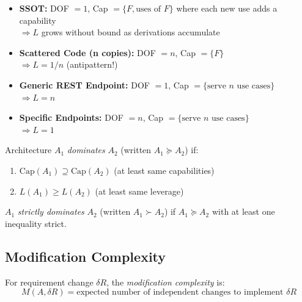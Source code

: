 \begin{example}
\begin{itemize}
\item \textbf{SSOT:} DOF $= 1$, Cap $= \{F, \text{uses of } F\}$ where each new use adds a capability \\
  $\Rightarrow L$ grows without bound as derivations accumulate

\item \textbf{Scattered Code (n copies):} DOF $= n$, Cap $= \{F\}$ \\
  $\Rightarrow L = 1/n$ (antipattern!)

\item \textbf{Generic REST Endpoint:} DOF $= 1$, Cap $= \{\text{serve } n \text{ use cases}\}$ \\
  $\Rightarrow L = n$

\item \textbf{Specific Endpoints:} DOF $= n$, Cap $= \{\text{serve } n \text{ use cases}\}$ \\
  $\Rightarrow L = 1$
\end{itemize}
\end{example}

\begin{definition}\label{def:dominance}
Architecture $A_1$ \emph{dominates} $A_2$ (written $A_1 \succeq A_2$) if:
\begin{enumerate}
\item $\text{Cap}(A_1) \supseteq \text{Cap}(A_2)$ (at least same capabilities)
\item $L(A_1) \geq L(A_2)$ (at least same leverage)
\end{enumerate}

$A_1$ \emph{strictly dominates} $A_2$ (written $A_1 \succ A_2$) if $A_1 \succeq A_2$ with at least one inequality strict.
\end{definition}

\subsection{Modification Complexity}

\begin{definition}\label{def:mod-complexity}
For requirement change $\delta R$, the \emph{modification complexity} is:
\[
M(A, \delta R) = \text{expected number of independent changes to implement } \delta R
\]
\end{definition}

